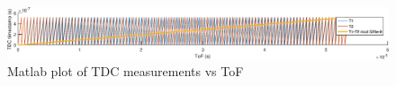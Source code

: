 \documentclass[a4paper]{scrartcl}
\begin{document}
%

\begin{figure}[h]
    \centering
    \includegraphics[width=\textwidth]{fig/frequency_hopping.eps}
    \caption{Matlab plot of TDC measurements vs ToF}
    \label{fig:frequency_hopping}
\end{figure}


\endpgfgraphicnamed
\end{document}
